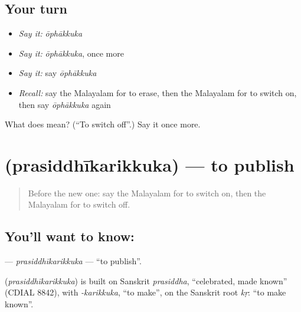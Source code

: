 \subsection*{Your turn}
\begin{itemize}
\raggedright
  \item \emph{Say it:} \emph{ōphākkuka}
  \item \emph{Say it:} \emph{ōphākkuka}, once more
  \item \emph{Say it:} say \emph{ōphākkuka}
  \item \emph{Recall:} say the Malayalam for to erase, then the Malayalam for to switch on, then say \emph{ōphākkuka} again
\end{itemize}

\begin{tcolorbox}[breakable,colback=teal!4,colframe=teal!35!black,title={Before you move on}]
What does  mean? (\textquotedblleft{}To switch off\textquotedblright{}.) Say it once more.
\end{tcolorbox}
\section[\texorpdfstring{\ml{പ്രസിദ്ധീകരിക്കുക} (prasiddhīkarikkuka)}{പ്രസിദ്ധീകരിക്കുക (prasiddhīkarikkuka)}]{ (prasiddhīkarikkuka) — to publish}

\label{lesson:ML-C188-prasiddhikarikkuka}



\begin{quote}
Before the new one: say the Malayalam for to switch on, then the Malayalam for to switch off.
\end{quote}

\subsection*{You'll want to know: }
\textbf{} — \emph{prasiddhīkarikkuka} — \textquotedblleft{}to publish\textquotedblright{}.

\begin{cousinweb}
\textbf{} (\emph{prasiddhīkarikkuka}) is built on Sanskrit \emph{prasiddha}, \textquotedblleft{}celebrated, made known\textquotedblright{} (CDIAL 8842), with \emph{-karikkuka}, \textquotedblleft{}to make\textquotedblright{}, on the Sanskrit root \emph{kṛ}: \textquotedblleft{}to make known\textquotedblright{}.
\end{cousinweb}

